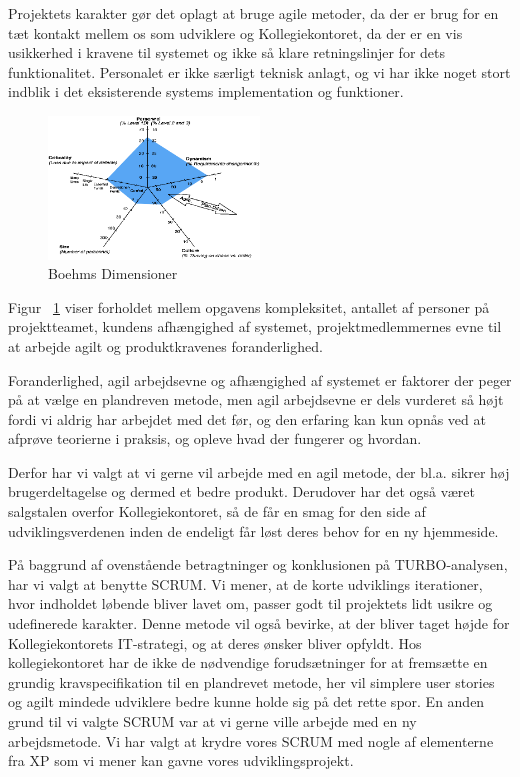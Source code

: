 \documentclass[12pt, a4paper]{report}
\begin{document}
Projektets karakter gør det oplagt at bruge agile metoder, da der er brug for en tæt kontakt mellem os som udviklere og Kollegiekontoret, da der er en vis usikkerhed i kravene til systemet og ikke så klare retningslinjer for dets funktionalitet. Personalet er ikke særligt teknisk anlagt, og vi har ikke noget stort indblik i det eksisterende systems implementation og funktioner.

\begin{figure}[ht]

\centering

\includegraphics[width=0.5\textwidth]{amoebe}

\caption{Boehms Dimensioner}

\label{amoeb}

\end{figure}

Figur ~\ref{amoeb} viser forholdet mellem opgavens kompleksitet, antallet af personer på projektteamet, kundens afhængighed af systemet, projektmedlemmernes evne til at arbejde agilt og produktkravenes foranderlighed.

Foranderlighed, agil arbejdsevne og afhængighed af systemet er faktorer der peger på at vælge en plandreven metode, men agil arbejdsevne er dels vurderet så højt fordi vi aldrig har arbejdet med det før, og den erfaring kan kun opnås ved at afprøve teorierne i praksis, og opleve hvad der fungerer og hvordan.

Derfor har vi valgt at vi gerne vil arbejde med en agil metode, der bl.a. sikrer høj brugerdeltagelse og dermed et bedre produkt. Derudover har det også været salgstalen overfor Kollegiekontoret, så de får en smag for den side af udviklingsverdenen inden de endeligt får løst deres behov for en ny hjemmeside.

På baggrund af ovenstående betragtninger og konklusionen på TURBO-analysen, har vi valgt at benytte SCRUM. Vi mener, at de korte udviklings iterationer, hvor indholdet løbende bliver lavet om, passer godt til projektets lidt usikre og udefinerede karakter.
Denne metode vil også bevirke, at der bliver taget højde for Kollegiekontorets IT-strategi, og at deres ønsker bliver opfyldt. Hos kollegiekontoret har de ikke de nødvendige forudsætninger for at fremsætte en grundig kravspecifikation til en plandrevet metode, her vil simplere user stories og agilt mindede udviklere bedre kunne holde sig på det rette spor.
En anden grund til vi valgte SCRUM var at vi gerne ville arbejde med en ny arbejdsmetode. Vi har valgt at krydre vores SCRUM med nogle af elementerne fra XP som vi mener kan gavne vores udviklingsprojekt.
\end{document}
